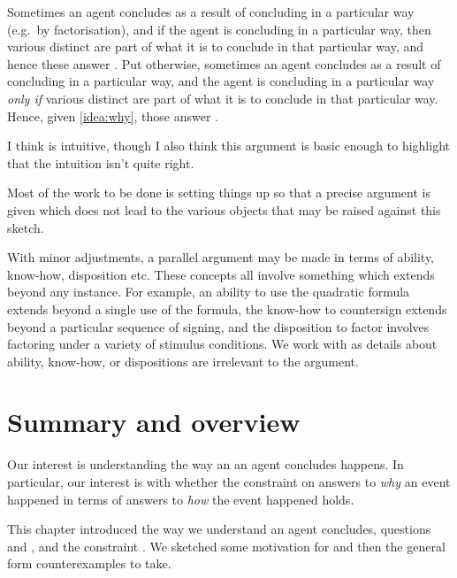 \begin{note}
  Sometimes an agent concludes as a result of concluding in a particular way (e.g.\ by factorisation), and if the agent is concluding in a particular way, then various distinct  are part of what it is to conclude in that particular way, and hence these answer \qWhy{}.
  Put otherwise, sometimes an agent concludes as a result of concluding in a particular way, and the agent is concluding in a particular way \emph{only if} various distinct  are part of what it is to conclude in that particular way.
  Hence, given \autoref{idea:why}, those \fingfr{} answer \qWhy{}.

  I think \issueInclusion{} is intuitive, though I also think this argument is basic enough to highlight that the intuition isn't quite right.

  Most of the work to be done is setting things up so that a precise argument is given which does not lead to the various objects that may be raised against this sketch.
\end{note}


\begin{note}
  With minor adjustments, a parallel argument may be made in terms of ability, know-how, disposition etc.
  These concepts all involve something which extends beyond any instance.
  For example, an ability to use the quadratic formula extends beyond a single use of the formula, the know-how to countersign extends beyond a particular sequence of signing, and the disposition to factor involves factoring under a variety of stimulus conditions.
  We work with  as details about ability, know-how, or dispositions are irrelevant to the argument.
\end{note}

\section{Summary and overview}
\label{sec:conclusion}

\begin{note}
  Our interest is understanding the way an  an agent concludes happens.
  In particular, our interest is with whether the constraint on answers to \emph{why} an event happened in terms of answers to \emph{how} the event happened holds.
\end{note}


\begin{note}
  This chapter introduced the way we understand  an agent concludes, questions \qWhy{} and \qHow{}, and the constraint \issueInclusion{}.
  We sketched some motivation for \issueInclusion{} and then the general form counterexamples to \issueInclusion{} take.
\end{note}


